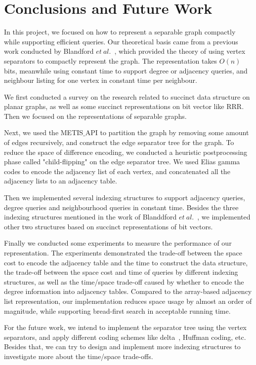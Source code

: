 \documentclass[12pt,glossary]{dalthesis}
\begin{document}
\chapter{Conclusions and Future Work}

In this project, we focused on how to represent a separable graph compactly while supporting efficient queries. Our theoretical basis came from a previous work conducted by Blandford $et \ al.$~\cite{compact-representation}, which provided the theory of using vertex separators to compactly represent the graph. The representation takes $O(n)$ bits, meanwhile using constant time to support degree or adjacency queries, and neighbour listing for one vertex in constant time per neighbour. 

\bigskip
\bigskip

We first conducted a survey on the research related to succinct data structure on planar graphs, as well as some succinct representations on bit vector like RRR. Then we focused on the representations of separable graphs. 

\bigskip
\bigskip

Next, we used the METIS$\_$API to partition the graph by removing some amount of edges recursively, and construct the edge separator tree for the graph. To reduce the space of difference encoding, we conducted a heuristic postprocessing phase called "child-flipping" on the edge separator tree. We used Elias gamma codes to encode the adjacency list of each vertex, and concatenated all the adjacency lists to an adjacency table.

\bigskip
\bigskip

Then we implemented several indexing structures to support adjacency queries, degree queries and neighbourhood queries in constant time. Besides the three indexing structures mentioned in the work of Blanddford $et \ al.$~\cite{compact-representation}, we implemented other two structures based on succinct representations of bit vectors.

\bigskip
\bigskip

Finally we conducted some experiments to measure the performance of our representation. The experiments demonstrated the trade-off between the space cost to encode the adjacency table and the time to construct the data structure, the trade-off between the space cost and time of queries by different indexing structures, as well as the time/space trade-off caused by whether to encode the degree information into adjacency tables. Compared to the array-based adjacency list representation, our implementation reduces space usage by almost an order of magnitude, while supporting bread-first search in acceptable running time.

\bigskip
\bigskip

For the future work, we intend to implement the separator tree using the vertex separators, and apply different coding schemes like delta~\cite{Elias}, Huffman coding, etc. Besides that, we can try to design and implement more indexing structures to investigate more about the time/space trade-offs.
 


\end{document}
